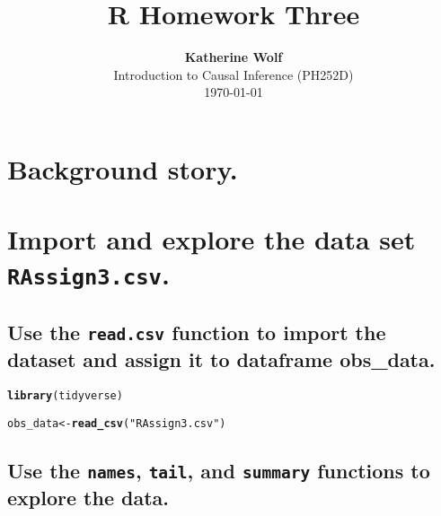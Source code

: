 \documentclass{article}\usepackage[]{graphicx}\usepackage[]{xcolor}
\title{\textbf{R Homework Three}}
\author{\textbf{Katherine Wolf}\\ Introduction to Causal Inference (PH252D)\\ \today}
\date{}
\makeatletter
\newcommand{\hlstr}[1]{\textcolor[rgb]{0.192,0.494,0.8}{#1}}%
\newcommand{\hlstd}[1]{\textcolor[rgb]{0.345,0.345,0.345}{#1}}%
\newcommand{\hlkwb}[1]{\textcolor[rgb]{0.69,0.353,0.396}{#1}}%
\newcommand{\hlkwd}[1]{\textcolor[rgb]{0.737,0.353,0.396}{\textbf{#1}}}%
\newenvironment{kframe}{%
 \def\at@end@of@kframe{}%
 \ifinner\ifhmode%
  \def\at@end@of@kframe{\end{minipage}}%
  \begin{minipage}{\columnwidth}%
 \fi\fi%
 \def\FrameCommand##1{\hskip\@totalleftmargin \hskip-\fboxsep
 \colorbox{shadecolor}{##1}\hskip-\fboxsep
     \hskip-\linewidth \hskip-\@totalleftmargin \hskip\columnwidth}%
 \MakeFramed {\advance\hsize-\width
   \@totalleftmargin\z@ \linewidth\hsize
   \@setminipage}}%
 {\par\unskip\endMakeFramed%
 \at@end@of@kframe}
\newenvironment{knitrout}{}{} %
\makeatother
\begin{document}
\maketitle

\section{Background story.}

\section{Import and explore the data set \texttt{RAssign3.csv}.}

  \subsection{Use the \texttt{read.csv} function to import the dataset and assign it to dataframe obs\_data.}
  
\begin{knitrout}
\color{fgcolor}\begin{kframe}
\begin{alltt}
\hlkwd{library}\hlstd{(tidyverse)}

\hlstd{obs_data} \hlkwb{<-} \hlkwd{read_csv}\hlstd{(}\hlstr{"RAssign3.csv"}\hlstd{)}
\end{alltt}
\end{kframe}
\end{knitrout}

  \subsection{Use the \texttt{names}, \texttt{tail}, and \texttt{summary} functions to explore the data.}
  
\end{document}
